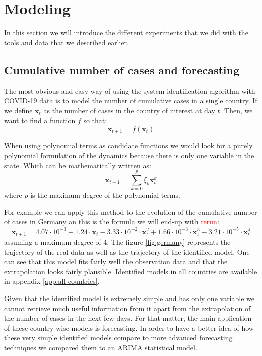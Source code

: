 \documentclass[12pt, letterpaper]{article}
\newcommand{\com}[1]{{\small {\fontfamily{ptm} \selectfont \textcolor{red}{#1}}}}
\begin{document}
\section{Modeling}

In this section we will introduce the different experiments that we did with the tools and data that we described earlier.

\subsection{Cumulative number of cases and forecasting}

The most obvious and easy way of using the system identification algorithm with COVID-19 data is to model the number of cumulative cases in a single country. If we define $\mathbf{x}_t$ as the number of cases in the country of interest at day $t$. Then, we want to find a function $f$ so that:
$$\mathbf{x}_{t+1} = f(\mathbf{x}_t)$$

When using polynomial terms as candidate functions we would look for a purely polynomial formulation of the dynamics because there is only one variable in the state. 
Which can be mathematically written as:
$$\mathbf{x}_{t+1} = \sum_{k=0}^p \xi_k \mathbf{x}_t^k$$
where $p$ is the maximum degree of the polynomial terms.

For example we can apply this method to the evolution of the cumulative number of cases in Germany an this is the formula we will end-up with \com{rerun}:
$$\mathbf{x}_{t+1} = 4.07 \cdot 10^{-3} + 1.24 \cdot \mathbf{x}_t - 3.33 \cdot 10^{-2} \cdot \mathbf{x}_t^2 + 1.66 \cdot 10^{-3} \cdot \mathbf{x}_t^3 - 3.21 \cdot 10^{-5} \cdot \mathbf{x}_t^4$$
assuming a maximum degree of 4. 
The figure \ref{fig:germany} represents the trajectory of the real data as well as the trajectory of the identified model. 
One can see that this model fits fairly well the observation data and that the extrapolation looks fairly plausible. 
Identified models in all countries are available in appendix \ref{app:all-countries}.

Given that the identified model is extremely simple and has only one variable we cannot retrieve much useful information from it apart from the extrapolation of the number of cases in the next few days. 
For that matter, the main application of these country-wise models is forecasting. 
In order to have a better idea of how these very simple identified models compare to more advanced forecasting techniques we compared them to an ARIMA statistical model.
\end{document}
